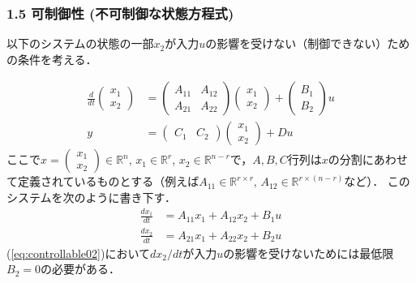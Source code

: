 \begin{frame}[t]
\frametitle{1.5 可制御性 (不可制御な状態方程式)}

以下のシステムの状態の一部$x_2$が入力$u$の影響を受けない（制御できない）ための条件を考える．

\begin{align}
 \frac{d}{dt}
  \left(\begin{array}{c}
         {x}_1 \\
	 {x}_2
	\end{array}\right)
  &=
  \left(\begin{array}{cc}
         {A}_{11} & {A}_{12} \\
	     {A}_{21} & {A}_{22}
	\end{array}\right)
  \left(\begin{array}{c}
         {x}_1 \\
	 {x}_2
	\end{array}\right)
  +
  \left(\begin{array}{c}
         {B}_1 \\
	 {B}_2
	\end{array}\right)
  u \\
 y &=
  \left(\begin{array}{cc}
         {C}_1 & {C}_2
	\end{array}\right)
  \left(\begin{array}{c}
         {x}_1 \\
	 {x}_2
	\end{array}\right)
  + D u
\end{align}
ここで$x = \left(\begin{array}{c} {x}_1 \\ {x}_2 \end{array}\right) \in {\mathbb R}^n$,
$x_1 \in {\mathbb R}^r$, $x_2 \in {\mathbb R}^{n-r}$で，$A,B,C$行列は$x$の分割にあわせて定義されているものとする（例えば$A_{11} \in {\mathbb R}^{r \times r}$, $A_{12} \in {\mathbb R}^{r \times (n-r)}$など）．
このシステムを次のように書き下す．
\begin{align}
 \frac{dx_1}{dt} &= A_{11} x_1 + A_{12} x_2 + B_1 u
\label{eq:controllable01} \\
 \frac{dx_2}{dt} &= A_{21} x_1 + A_{22} x_2 + B_2 u
\label{eq:controllable02}
\end{align}
(\ref{eq:controllable02})において$dx_2/dt$が入力$u$の影響を受けないためには最低限$B_2=0$の必要がある．
\end{frame}

